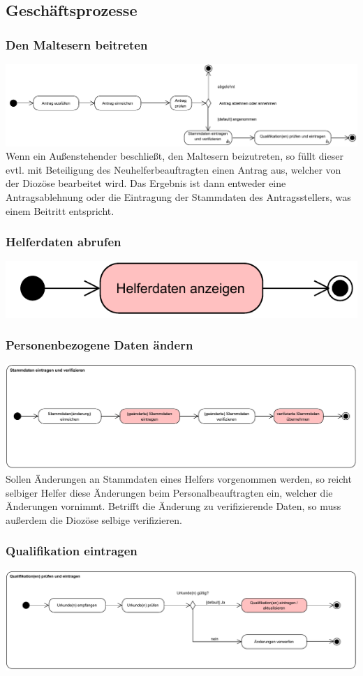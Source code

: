 \documentclass{beamer}
\begin{document}
\subsection{Geschäftsprozesse}		
\begin{frame}
\frametitle{Den Maltesern beitreten}
\includegraphics[width=\textwidth]{PDF/BusinessP/Mitglied_werden.pdf}
\pause
Wenn ein Außenstehender beschließt, den Maltesern beizutreten, so füllt dieser evtl. mit Beteiligung des Neuhelferbeauftragten einen Antrag aus, welcher von der Diozöse bearbeitet wird. Das Ergebnis ist dann entweder eine Antragsablehnung oder die Eintragung der Stammdaten des Antragsstellers, was einem Beitritt entspricht. 
\end{frame}
\begin{frame}
\frametitle{Helferdaten abrufen}
\includegraphics[width=\textwidth]{PDF/BusinessP/Daten_abrufen.pdf}
\end{frame}

\begin{frame}
\frametitle{Personenbezogene Daten ändern}
\includegraphics[width=\textwidth]{PDF/BusinessP/Daten_aendern.pdf}
\pause
Sollen Änderungen an Stammdaten eines Helfers vorgenommen werden, so reicht selbiger Helfer diese Änderungen beim Personalbeauftragten ein, welcher die Änderungen vornimmt. Betrifft die Änderung zu verifizierende Daten, so muss außerdem die Diozöse selbige verifizieren.
\end{frame}

\begin{frame}
\frametitle{Qualifikation eintragen}
\includegraphics[width=\textwidth]{PDF/BusinessP/Qualifikation_eintragen.pdf}
\end{frame}
\end{document}
